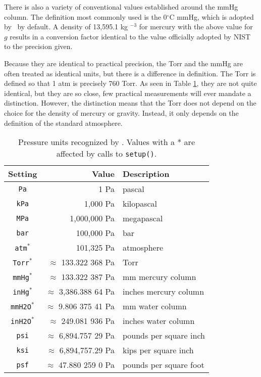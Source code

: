 There is also a variety of conventional values established around the mmHg column.  The definition most commonly used is the 0$^\circ$C mmHg, which is adopted by \PM\ by default.  A density of 13,595.1 kg $^{-3}$ for mercury with the above value for $g$ results in a conversion factor identical to the value officially adopted by NIST \cite[p.52]{nist:sp811} to the precision given.

Because they are identical to practical precision, the Torr and the mmHg are often treated as identical units, but there is a difference in definition.  The Torr is defined so that 1 atm is precisely 760 Torr.  As seen in Table \ref{tab:pressure}, they are not quite identical, but they are so close, few practical measurements will ever mandate a distinction.  However, the distinction means that the Torr does not depend on the choice for the density of mercury or gravity.  Instead, it only depends on the definition of the standard atmosphere.

\begin{table}
\centering
\caption{Pressure units recognized by \PM. Values with a * are affected by calls to \texttt{setup()}.}\label{tab:pressure}
\begin{tabular}{crl}
\hline
Setting & Value & Description\\
\hline
\verb|Pa| & 1 Pa & pascal\\
\verb|kPa| & 1,000 Pa & kilopascal\\
\verb|MPa| & 1,000,000 Pa & megapascal\\
\verb|bar| & 100,000 Pa & bar\\
\verb|atm|$^*$ & 101,325 Pa & atmosphere\\
\verb|Torr|$^*$ & $\approx$ 133.322 368 Pa & Torr\\
\verb|mmHg|$^*$ & $\approx$ 133.322 387 Pa & mm mercury column\\
\verb|inHg|$^*$ & $\approx$ 3,386.388 64 Pa & inches mercury column\\
\verb|mmH2O|$^*$ & $\approx$ 9.806 375 41 Pa & mm water column\\
\verb|inH2O|$^*$ & $\approx$ 249.081 936 Pa & inches water column\\
\verb|psi| & $\approx$ 6,894.757 29 Pa & pounds per square inch\\
\verb|ksi| & $\approx$ 6,894,757.29 Pa & kips per square inch\\
\verb|psf| & $\approx$ 47.880 259 0 Pa & pounds per square foot\\
\hline
\end{tabular}
\end{table}

